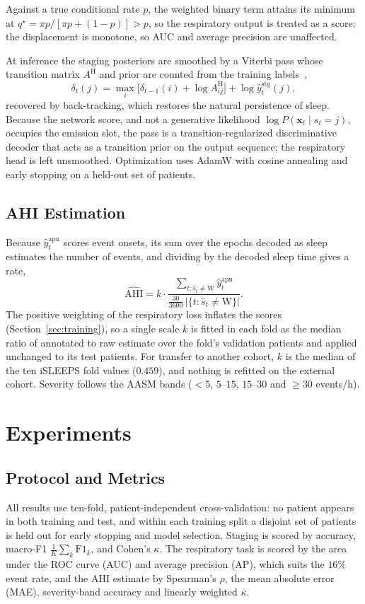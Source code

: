 \documentclass[a4paper,fleqn]{cas-sc}
\begin{document}
Against a true conditional rate $p$, the weighted binary term attains its minimum at
$q^{\star}=\pi p/[\pi p+(1-p)]>p$, so the respiratory output is treated as a score; the displacement is monotone, so AUC and average precision are
unaffected.

At inference the staging
posteriors are smoothed by a Viterbi pass whose transition matrix $A^{\mathrm H}$
and prior are counted from the training labels~\cite{chen2024hmm},
\begin{equation}
\delta_t(j)=\max_i\big[\delta_{t-1}(i)+\log A^{\mathrm H}_{ij}\big]+\log\hat y^{\mathrm{stg}}_t(j),
\end{equation}
recovered by back-tracking, which restores the natural persistence of sleep. Because the network
score, and not a generative likelihood $\log P(\mathbf{x}_t\mid s_t=j)$, occupies the emission
slot, the pass is a transition-regularized discriminative decoder that acts as a transition prior
on the output sequence; the respiratory head is left unsmoothed. Optimization
uses AdamW with cosine annealing and early stopping on a held-out set of patients.

\subsection{AHI Estimation}
\label{sec:ahimethod}
Because $\hat y^{\mathrm{apn}}_t$ scores event onsets, its sum over the epochs decoded as sleep
estimates the number of events, and dividing by the decoded sleep time gives a rate,
\begin{equation}
\widehat{\mathrm{AHI}}=k\cdot\frac{\sum_{t:\hat s_t\neq\mathrm{W}}\hat y^{\mathrm{apn}}_t}{\tfrac{30}{3600}\,\lvert\{t:\hat s_t\neq\mathrm{W}\}\rvert}.
\end{equation}
The positive weighting of the respiratory loss inflates the scores
(Section~\ref{sec:training}), so a single scale $k$ is fitted in each fold as the median ratio
of annotated to raw estimate over the fold's validation patients and applied unchanged to its
test patients. For transfer to another cohort, $k$ is the median of the ten iSLEEPS fold
values ($0.459$), and nothing is refitted on the external cohort. Severity follows the AASM
bands ($<5$, $5$--$15$, $15$--$30$ and $\geq30$ events/h).

\section{Experiments}
\label{sec:results}
\subsection{Protocol and Metrics}
All results use ten-fold, patient-independent cross-validation: no patient appears in both
training and test, and within each training split a disjoint set of patients is held out for
early stopping and model selection. Staging is scored by accuracy, macro-F1
$\tfrac{1}{K}\sum_k\mathrm{F1}_k$, and Cohen's $\kappa$. The respiratory task is scored by the
area under the ROC curve (AUC) and average precision (AP), which suits the $16\%$ event rate,
and the AHI estimate by Spearman's $\rho$, the mean absolute error (MAE), severity-band accuracy
and linearly weighted $\kappa$.
\end{document}
